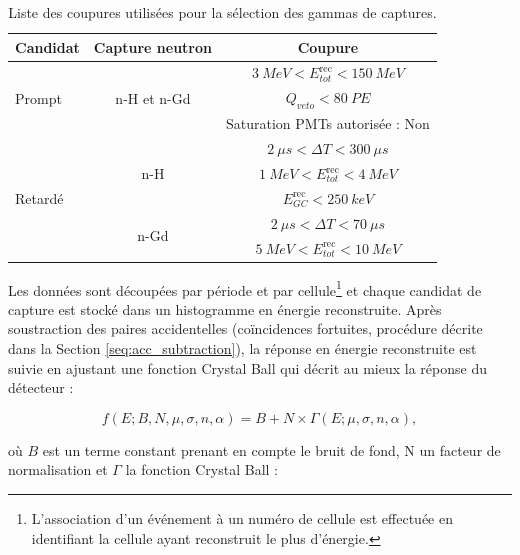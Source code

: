 \begin{table}[h!]
  \begin{center}
    \begin{tabular}{|l|c|c|}
      \hline
      \textbf{Candidat} & \textbf{Capture neutron} & \textbf{Coupure}\\
      \hline
      \multirow{3}{*}{Prompt} & \multirow{3}{*}{n-H et n-Gd} & $\SI{3}{MeV} < E^{\textrm{rec}}_{tot} < \SI{150}{MeV} $\\
      & & $Q_{veto} < \SI{80}{PE}$\\
      & & Saturation PMTs autorisée : Non\\
      \hline
      \multirow{5}{*}{Retardé} & \multirow{3}{*}{n-H} & $\SI{2}{\mu s} < \Delta T < \SI{300}{\mu s} $\\
      & & $\SI{1}{MeV} < E^{\textrm{rec}}_{tot} < \SI{4}{MeV} $\\
      & & $E^{\textrm{rec}}_{GC} < \SI{250}{keV}$\\
      \cline{2-3}
      & \multirow{2}{*}{n-Gd} & $\SI{2}{\mu s} < \Delta T < \SI{70}{\mu s} $\\
      & & $\SI{5}{MeV} < E^{\textrm{rec}}_{tot} < \SI{10}{MeV} $\\
      \hline
    \end{tabular}
    \caption[Liste des coupures utilisées pour la sélection des gammas de captures]{Liste des coupures utilisées pour la sélection des gammas de captures.}
    \label{tab:pair_search_cuts_for_nX_monitoring}
  \end{center}
\end{table}

Les données sont découpées par période et par cellule\footnote{L'association d'un événement à un numéro de cellule est effectuée en identifiant la cellule ayant reconstruit le plus d'énergie.} et chaque candidat de capture est stocké dans un histogramme en énergie reconstruite. Après soustraction des paires accidentelles (coïncidences fortuites, procédure décrite dans la Section \ref{seq:acc_subtraction}), la réponse en énergie reconstruite est suivie en ajustant une fonction \og Crystal Ball\fg{} qui décrit au mieux la réponse du détecteur \cite{Gaiser:1982yw} :

\begin{equation}
    \label{eq:nX_fit_function}
    f(E; B, N, \mu, \sigma, n, \alpha) = B + N \times \Gamma(E;\mu, \sigma, n, \alpha),
\end{equation}

où $B$ est un terme constant prenant en compte le bruit de fond, N un facteur de normalisation et $\Gamma$ la fonction Crystal Ball :

